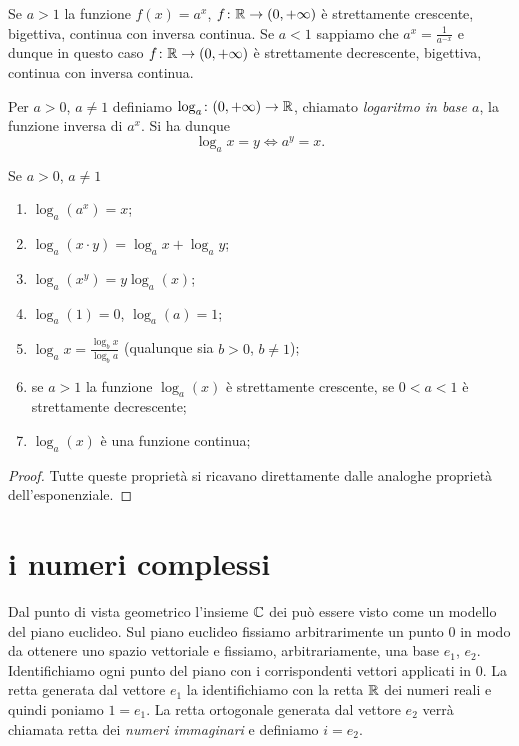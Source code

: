 Se $a> 1$ la funzione $f(x) = a^x$,
$f\colon \mathbb R\to(0,+\infty)$
è strettamente crescente, bigettiva, continua
con inversa continua.
Se $a<1$ sappiamo che $a^x = \frac{1}{a^{-x}}$ e dunque
in questo caso $f\colon \mathbb R \to (0,+\infty)$ è
strettamente decrescente, bigettiva, continua con inversa
continua.

\begin{definition}[logaritmo]
Per $a>0$, $a\neq 1$ definiamo $\log_a\colon (0,+\infty)\to \mathbb R$,
chiamato \emph{logaritmo in base $a$},
la funzione inversa di $a^x$.
Si ha dunque
\[
  \log_a x = y \iff a^y = x.
\]
\end{definition}

\begin{theorem}
Se $a>0$, $a\neq 1$
\begin{enumerate}
  \item $\log_a(a^x) = x$;
  \item $\log_a(x\cdot y)= \log_a x + \log_a y$;
  \item $\log_a(x^y) = y \log_a (x)$;
  \item $\log_a(1) = 0$, $\log_a(a)=1$;
  \item  $\displaystyle  \log_a x = \frac{\log_b x}{\log_b a}$
  (qualunque sia $b>0$, $b\neq 1$);
  \item se $a>1$ la funzione $\log_a(x)$ è strettamente crescente,
  se $0<a<1$ è strettamente decrescente;
  \item $\log_a(x)$ è una funzione continua;
\end{enumerate}
%
\begin{proof}
Tutte queste proprietà si ricavano direttamente dalle analoghe proprietà
dell'esponenziale.
\end{proof}
\end{theorem}

\section{i numeri complessi}

Dal punto di vista geometrico l'insieme $\CC$ dei 
\index{$\CC$}
può essere visto come un modello del piano euclideo.
Sul piano euclideo fissiamo arbitrarimente un punto $0$ in modo da ottenere uno spazio
vettoriale e fissiamo, arbitrariamente, una base $e_1$, $e_2$.
Identifichiamo ogni punto del piano con i corrispondenti vettori
applicati in $0$. La retta generata dal vettore $e_1$ la identifichiamo
con la retta $\mathbb R$ dei numeri reali e quindi poniamo $1=e_1$.
La retta ortogonale generata dal vettore $e_2$ verrà chiamata
retta dei \emph{numeri immaginari} e definiamo $i=e_2$.

